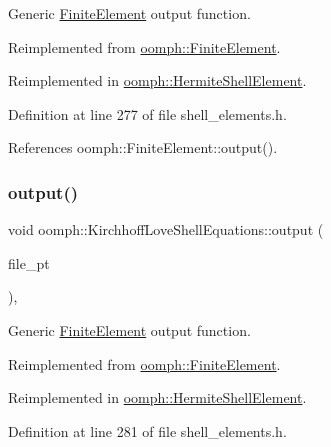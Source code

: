 Generic \hyperlink{classoomph_1_1FiniteElement}{Finite\+Element} output function. 



Reimplemented from \hyperlink{classoomph_1_1FiniteElement_afa9d9b2670f999b43e6679c9dd28c457}{oomph\+::\+Finite\+Element}.



Reimplemented in \hyperlink{classoomph_1_1HermiteShellElement_a2f76280c3af060304800b5bc0aeb02d8}{oomph\+::\+Hermite\+Shell\+Element}.



Definition at line 277 of file shell\+\_\+elements.\+h.



References oomph\+::\+Finite\+Element\+::output().

\mbox{\label{classoomph_1_1KirchhoffLoveShellEquations_adf7b87a8ee3ae1a594cd88772b7ac694}} 
\subsubsection{\texorpdfstring{output()}{output()}\hspace{0.1cm}{\footnotesize\ttfamily [3/4]}}
{\footnotesize\ttfamily void oomph\+::\+Kirchhoff\+Love\+Shell\+Equations\+::output (\begin{DoxyParamCaption}\item[{F\+I\+LE $\ast$}]{file\+\_\+pt }\end{DoxyParamCaption})\hspace{0.3cm}{\ttfamily [inline]}, {\ttfamily [virtual]}}



Generic \hyperlink{classoomph_1_1FiniteElement}{Finite\+Element} output function. 



Reimplemented from \hyperlink{classoomph_1_1FiniteElement_a72cddd09f8ddbee1a20a1ff404c6943e}{oomph\+::\+Finite\+Element}.



Reimplemented in \hyperlink{classoomph_1_1HermiteShellElement_a126ebcc503395e036c6bfaf8fabbc800}{oomph\+::\+Hermite\+Shell\+Element}.



Definition at line 281 of file shell\+\_\+elements.\+h.



